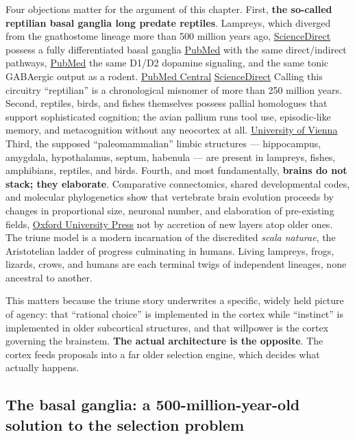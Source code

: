 Four objections matter for the argument of this chapter. First, \textbf{the so-called reptilian basal ganglia long predate reptiles}. Lampreys, which diverged from the gnathostome lineage more than 500 million years ago, \href{https://www.sciencedirect.com/science/article/pii/S0960982216306807}{ScienceDirect} possess a fully differentiated basal ganglia \href{https://pubmed.ncbi.nlm.nih.gov/21700460/}{PubMed} with the same direct/indirect pathways, \href{https://pubmed.ncbi.nlm.nih.gov/23318875/}{PubMed} the same D1/D2 dopamine signaling, and the same tonic GABAergic output as a rodent. \href{https://pmc.ncbi.nlm.nih.gov/articles/PMC3853485/}{PubMed Central} \href{https://www.sciencedirect.com/science/article/pii/S0960982214012998}{ScienceDirect} Calling this circuitry ``reptilian'' is a chronological misnomer of more than 250 million years. Second, reptiles, birds, and fishes themselves possess pallial homologues that support sophisticated cognition; the avian pallium runs tool use, episodic-like memory, and metacognition without any neocortex at all. \href{https://ucrisportal.univie.ac.at/en/publications/cognition-without-cortex/}{University of Vienna} Third, the supposed ``paleomammalian'' limbic structures --- hippocampus, amygdala, hypothalamus, septum, habenula --- are present in lampreys, fishes, amphibians, reptiles, and birds. Fourth, and most fundamentally, \textbf{brains do not stack; they elaborate}. Comparative connectomics, shared developmental codes, and molecular phylogenetics show that vertebrate brain evolution proceeds by changes in proportional size, neuronal number, and elaboration of pre-existing fields, \href{https://global.oup.com/ushe/product/principles-of-brain-evolution-9780878938209}{Oxford University Press} not by accretion of new layers atop older ones. The triune model is a modern incarnation of the discredited \emph{scala naturae}, the Aristotelian ladder of progress culminating in humans. Living lampreys, frogs, lizards, crows, and humans are each terminal twigs of independent lineages, none ancestral to another.

This matters because the triune story underwrites a specific, widely held picture of agency: that ``rational choice'' is implemented in the cortex while ``instinct'' is implemented in older subcortical structures, and that willpower is the cortex governing the brainstem. \textbf{The actual architecture is the opposite}. The cortex feeds proposals into a far older selection engine, which decides what actually happens.

\subsection{The basal ganglia: a 500-million-year-old solution to the selection problem}\label{05_vertebrates-the-basal-ganglia-a-500-million-year-old-solution-to-the-selection-problem}

